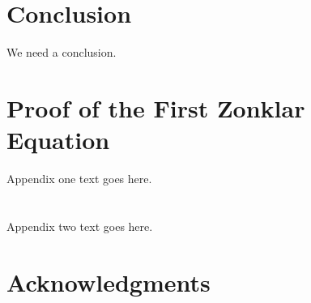 \documentclass[10pt,journal,compsoc]{IEEEtran}
\begin{document}
\section{Conclusion}
We need a conclusion.








%


\appendices
\section{Proof of the First Zonklar Equation}
Appendix one text goes here.

\section{}
Appendix two text goes here.


\ifCLASSOPTIONcompsoc
  \section*{Acknowledgments}
\else
\end{document}
